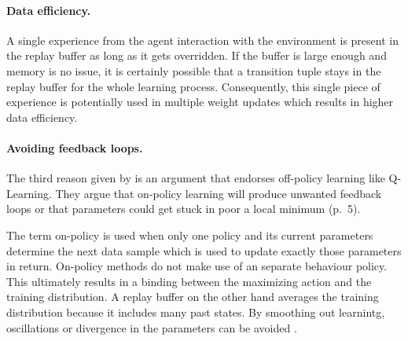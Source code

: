 \paragraph{Data efficiency.} A single experience from the agent interaction with the environment is present in the replay buffer as long as it gets overridden. If the buffer is large enough and memory is no issue, it is certainly possible that a transition tuple stays in the replay buffer for the whole learning process. Consequently, this single piece of experience is potentially used in multiple weight updates which results in higher data efficiency.

\paragraph{Avoiding feedback loops.} The third reason given by \cite{mnih2013playing} is an argument that endorses off-policy learning like Q-Learning. They argue that on-policy learning will produce unwanted feedback loops or that parameters could get stuck in poor a local minimum (p.~5). 
\par 
The term on-policy is used when only one policy and its current parameters determine the next data sample which is used to update exactly those parameters in return. On-policy methods do not make use of an separate behaviour policy. This ultimately results in a  binding between the maximizing action and the training distribution. A replay buffer on the other hand averages the training distribution because it includes many past states. By smoothing out learnintg,
oscillations or divergence in the parameters can be avoided \cite[p.~5]{mnih2013playing}.